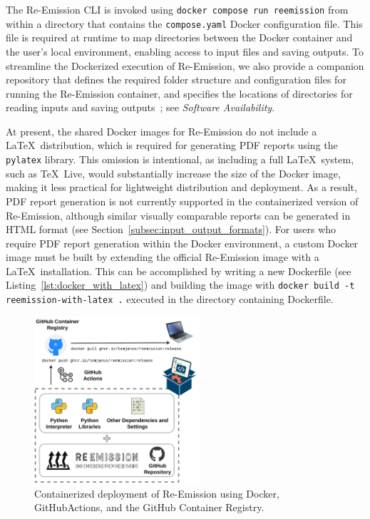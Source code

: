 \documentclass[final,1p,times]{elsarticle}
\begin{document}
The Re-Emission \ac{CLI} is invoked using \verb|docker compose run reemission| from within a directory that contains the \verb|compose.yaml| Docker configuration file.
This file is required at runtime to map directories between the Docker container and the user's local environment, enabling access to input files and saving outputs.
To streamline the Dockerized execution of Re-Emission, we also provide a companion repository that defines the required folder structure and configuration files for running the Re-Emission container, and specifies the locations of directories for reading inputs and saving outputs~\cite{janus_geocaret_reemission}; see \emph{Software Availability}.

At present, the shared Docker images for Re-Emission do not include a \LaTeX\ distribution, which is required for generating PDF reports using the \verb|pylatex| library. 
This omission is intentional, as including a full \LaTeX\ system, such as TeX~Live, would substantially increase the size of the Docker image, making it less practical for lightweight distribution and deployment. 
As a result, PDF report generation is not currently supported in the containerized version of Re-Emission, although similar visually comparable reports can be generated in HTML format (see Section~\ref{subsec:input_output_formats}).
For users who require PDF report generation within the Docker environment, a custom Docker image must be built by extending the official Re-Emission image with a \LaTeX\ installation. 
This can be accomplished by writing a new Dockerfile (see Listing~\ref{lst:docker_with_latex}) and building the image with \verb|docker build -t reemission-with-latex .| executed in the directory containing Dockerfile.

\begin{figure}[ht]
    \centering
    \includegraphics[width=0.55\textwidth]{figures/docker-explanation.drawio.pdf}
    \caption{{Containerized deployment of Re-Emission using Docker, GitHubActions, and the GitHub Container Registry.}}
    \label{fig:docker_containerizing}
\end{figure}
\end{document}
